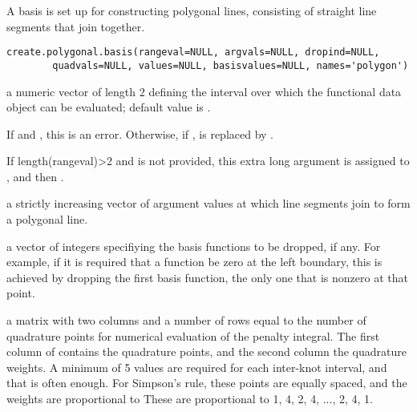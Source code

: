 \begin{Description}\relax
A basis is set up for constructing polygonal lines, consisting of
straight line segments that join together.
\end{Description}
\begin{Usage}
\begin{verbatim}
create.polygonal.basis(rangeval=NULL, argvals=NULL, dropind=NULL,
        quadvals=NULL, values=NULL, basisvalues=NULL, names='polygon')
\end{verbatim}
\end{Usage}
\begin{Arguments}
\begin{ldescription}
\item[\code{rangeval}] a numeric vector of length 2 defining the interval over which the
functional data object can be evaluated;  default value is
.

If  and , this is an
error.  Otherwise, if , 
is replaced by .

If length(rangeval)>2 and  is not provided, this extra
long  argument is assigned to , and
then .

\item[\code{argvals}] a strictly increasing vector of argument values at which line
segments join to form a polygonal line.

\item[\code{dropind}] a vector of integers specifiying the basis functions to
be dropped, if any.  For example, if it is required that
a function be zero at the left boundary, this is achieved
by dropping the first basis function, the only one that
is nonzero at that point.

\item[\code{quadvals}] a matrix with two columns and a number of rows equal to the number
of quadrature points for numerical evaluation of the penalty
integral.  The first column of  contains the
quadrature points, and the second column the quadrature weights.  A
minimum of 5 values are required for each inter-knot interval, and
that is often enough.  For Simpson's rule, these points are equally
spaced, and the weights are proportional to These are proportional
to 1, 4, 2, 4, ..., 2, 4, 1.


\end{ldescription}
\end{Arguments}
